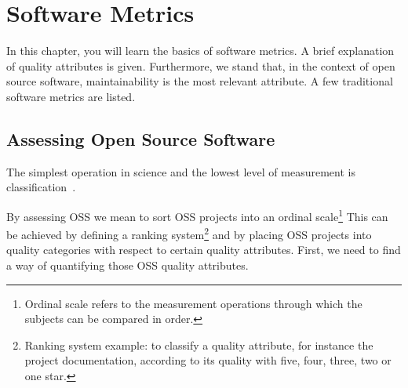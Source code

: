 \thispagestyle{empty}
\chapter{Software Metrics}\label{chap:software_metrics}

In this chapter, you will learn the basics of software metrics. 
A brief explanation of quality attributes is given. Furthermore, we stand that, in the context of open source software, maintainability is the most relevant attribute. A few traditional software metrics are listed.


\section{Assessing Open Source Software} \label{sec:assessing}
The simplest operation in science and the lowest level of measurement is classification~\cite{kan2002metrics}.

By assessing OSS we mean to sort OSS projects into an
\textsf{ordinal scale}\footnote{Ordinal scale refers to the measurement operations through which the subjects can be compared in order.}
This can be achieved by defining a
\textsf{ranking system}\footnote{
  Ranking system example: to classify a quality attribute, for instance the project documentation, according to its quality with
  five, four, three, two or one star.
} and by placing OSS projects into quality categories with respect to certain quality attributes.
First, we need to find a way of quantifying those OSS quality attributes.


